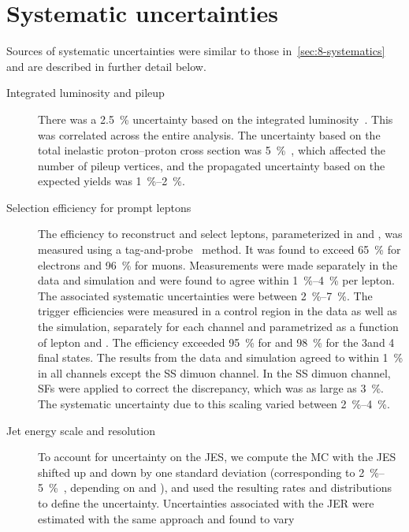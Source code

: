 \section{Systematic uncertainties}
\label{sec:13-systematics}
Sources of systematic uncertainties were similar to those in~\cref{sec:8-systematics} and are
described in further detail below.

\begin{description}
  \item[Integrated luminosity and pileup] There was a \SI{2.5}{\percent} uncertainty based on the
    integrated luminosity~\cite{CMS-PAS-LUM-17-001}. This was correlated across the entire analysis.
    The uncertainty based on the total inelastic proton--proton cross section was
    \SI{5}{\percent}~\cite{ATLAS:2016pu}, which affected the number of pileup vertices, and the
    propagated uncertainty based on the expected yields was \SIrange{1}{2}{\percent}.
  \item[Selection efficiency for prompt leptons] The efficiency to reconstruct and select leptons,
    parameterized in \pT and \Peta, was measured using a
    tag-and-probe~\cite{Chatrchyan:2012xi,Khachatryan:2015hwa} method. It was found to exceed
    \SI{65}{\percent} for electrons and \SI{96}{\percent} for muons. Measurements were made
    separately in the data and simulation and were found to agree within \SIrange{1}{4}{\percent}
    per lepton. The associated systematic uncertainties were between \SIrange{2}{7}{\percent}. The
    trigger efficiencies were measured in a control region in the data as well as the simulation,
    separately for each channel and parametrized as a function of lepton \pT and \eta. The
    efficiency exceeded \SI{95}{\percent} for \ttW and \SI{98}{\percent} for the 3\lep and 4\lep
    \ttZ final states. The results from the data and simulation agreed to within \SI{1}{\percent} in
    all channels except the SS dimuon channel. In the SS dimuon channel, SFs were applied to correct
    the discrepancy, which was as large as \SI{3}{\percent}. The systematic uncertainty due to this
    scaling varied between \SIrange{2}{4}{\percent}.
  \item[Jet energy scale and resolution] To account for uncertainty on the JES, we compute the MC
    with the JES shifted up and down by one standard deviation (corresponding to
    \SIrange{2}{5}{\percent}~\cite{JME-13-003,CMS-PAS-JME-16-004}, depending on \pT and \Peta), and
    used the resulting rates and distributions to define the uncertainty. Uncertainties associated
    with the JER were estimated with the same approach and found to vary

\end{description}
